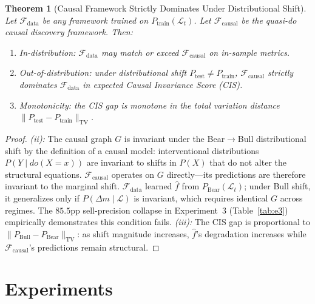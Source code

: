 \documentclass[12pt]{article}
\newtheorem{theorem}{Theorem}
\begin{document}
\begin{theorem}[Causal Framework Strictly Dominates Under Distributional Shift]
\label{thm:outperformance}
Let $\mathcal{F}_{\mathrm{data}}$ be any framework trained on
$P_{\mathrm{train}}(\mathcal{L}_t)$.
Let $\mathcal{F}_{\mathrm{causal}}$ be the quasi-do causal
discovery framework.
Then:
\begin{enumerate}
\item[(i)] \textit{In-distribution:} $\mathcal{F}_{\mathrm{data}}$
           may match or exceed $\mathcal{F}_{\mathrm{causal}}$
           on in-sample metrics.
\item[(ii)] \textit{Out-of-distribution:} under distributional shift
            $P_{\mathrm{test}} \neq P_{\mathrm{train}}$,
            $\mathcal{F}_{\mathrm{causal}}$ strictly dominates
            $\mathcal{F}_{\mathrm{data}}$ in expected
            Causal Invariance Score (CIS).
\item[(iii)] \textit{Monotonicity:} the CIS gap is monotone in the
             total variation distance
             $\|P_{\mathrm{test}} - P_{\mathrm{train}}\|_{\mathrm{TV}}$.
\end{enumerate}
\end{theorem}

\begin{proof}
\textit{(ii):} The causal graph $G$ is invariant under the
Bear$\to$Bull distributional shift by the definition of a causal model:
interventional distributions $P(Y \mid do(X=x))$ are invariant to
shifts in $P(X)$ that do not alter the structural equations.
$\mathcal{F}_{\mathrm{causal}}$ operates on $G$ directly---its
predictions are therefore invariant to the marginal shift.
$\mathcal{F}_{\mathrm{data}}$ learned $\hat{f}$ from
$P_{\mathrm{Bear}}(\mathcal{L}_t)$;
under Bull shift, it generalizes only if
$P(\Delta m \mid \mathcal{L})$ is invariant,
which requires identical $G$ across regimes.
The $85.5$pp sell-precision collapse in Experiment~3
(Table~\ref{tab:e3}) empirically demonstrates this condition fails.
\textit{(iii):} The CIS gap is proportional to
$\|P_{\mathrm{Bull}} - P_{\mathrm{Bear}}\|_{\mathrm{TV}}$:
as shift magnitude increases, $\hat{f}$'s degradation increases
while $\mathcal{F}_{\mathrm{causal}}$'s predictions remain structural.
\end{proof}

\section{Experiments}
\label{sec:experiments}
\end{document}
